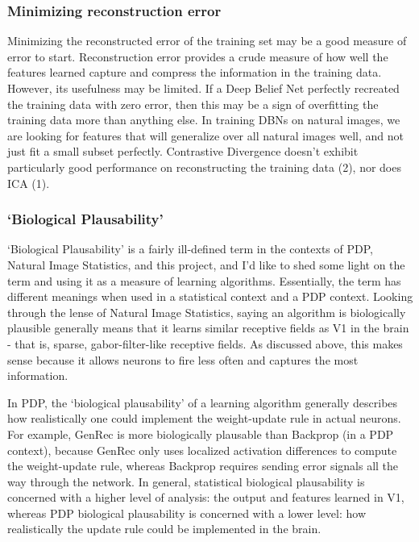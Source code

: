 \documentclass{article} %
\begin{document}
\subsubsection{Minimizing reconstruction error}

Minimizing the reconstructed error of the training set may be a good measure of error to start. Reconstruction error provides a crude measure of how well the features learned capture and compress the information in the training data. However, its usefulness may be limited. If a Deep Belief Net perfectly recreated the training data with zero error, then this may be a sign of overfitting the training data more than anything else. In training DBNs on natural images, we are looking for features that will generalize over all natural images well, and not just fit a small subset perfectly. Contrastive Divergence doesn't exhibit particularly good performance on reconstructing the training data (2), nor does ICA (1).

\subsubsection{`Biological Plausability'}

`Biological Plausability' is a fairly ill-defined term in the contexts of PDP, Natural Image Statistics, and this project, and I'd like to shed some light on the term and using it as a measure of learning algorithms. Essentially, the term has different meanings when used in a statistical context and a PDP context. Looking through the lense of Natural Image Statistics, saying an algorithm is biologically plausible generally means that it learns similar receptive fields as V1 in the brain - that is, sparse, gabor-filter-like receptive fields. As discussed above, this makes sense because it allows neurons to fire less often and captures the most information.

In PDP, the `biological plausability' of a learning algorithm generally describes how realistically one could implement the weight-update rule in actual neurons. For example, GenRec is more biologically plausable than Backprop (in a PDP context), because GenRec only uses localized activation differences to compute the weight-update rule, whereas Backprop requires sending error signals all the way through the network. In general, statistical biological plausability is concerned with a higher level of analysis: the output and features learned in V1, whereas PDP biological plausability is concerned with a lower level: how realistically the update rule could be implemented in the brain.
\end{document}

